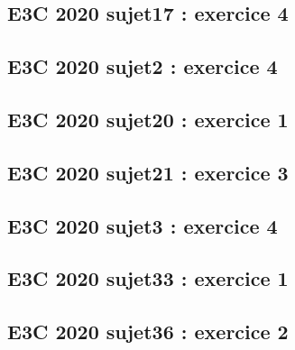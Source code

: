 \documentclass[lang=fr,edition=teacher,layout=sheet]{mxbook}
\begin{document}
\begingroup\endgroup
\par\bigskip
{}\subsection*{E3C 2020 sujet17 : exercice 4}
\begingroup\endgroup
\par\bigskip
{}\subsection*{E3C 2020 sujet2 : exercice 4}
\begingroup\endgroup
\par\bigskip
{}\subsection*{E3C 2020 sujet20 : exercice 1}
\begingroup\endgroup
\par\bigskip
{}\subsection*{E3C 2020 sujet21 : exercice 3}
\begingroup\endgroup
\par\bigskip
{}\subsection*{E3C 2020 sujet3 : exercice 4}
\begingroup\endgroup
\par\bigskip
{}\subsection*{E3C 2020 sujet33 : exercice 1}
\begingroup\endgroup
\par\bigskip
{}\subsection*{E3C 2020 sujet36 : exercice 2}
\begingroup\endgroup
\end{document}
